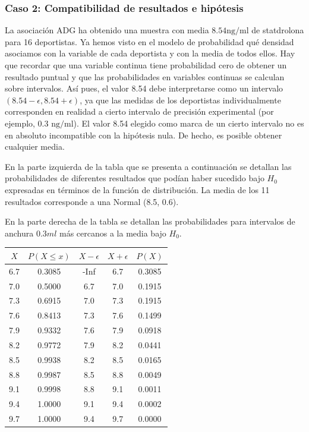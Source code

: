 \documentclass[
]{article}
\begin{document}
\subsubsection{Caso 2: Compatibilidad de resultados e hipótesis}\label{caso-2-compatibilidad-de-resultados-e-hipuxf3tesis}

La asociación ADG ha obtenido una muestra con media \(8.54 \mathrm{ng} / \mathrm{ml}\) de statdrolona para 16 deportistas. Ya hemos visto en el modelo de probabilidad qué densidad asociamos con la variable de cada deportista y con la media de todos ellos. Hay que recordar que una variable continua tiene probabilidad cero de obtener un resultado puntual y que las probabilidades en variables continuas se calculan sobre intervalos. Así pues, el valor 8.54 debe interpretarse como un intervalo \((8.54-\epsilon, 8.54+\epsilon)\), ya que las medidas de los deportistas individualmente corresponden en realidad a cierto intervalo de precisión experimental (por ejemplo, 0.3 \(\mathrm{ng} / \mathrm{ml}\)). El valor 8.54 elegido como marca de un cierto intervalo no es en absoluto incompatible con la hipótesis nula. De hecho, es posible obtener cualquier media.

En la parte izquierda de la tabla que se presenta a continuación se detallan las probabilidades de diferentes resultados que podían haber sucedido bajo \(H_0\) expresadas en términos de la función de distribución. La media de los 11 resultados corresponde a una Normal (8.5, 0.6).

En la parte derecha de la tabla se detallan las probabilidades para intervalos de anchura \(0.3 ml\) más cercanos a la media bajo \(H_0\).

\begin{tabular}{c|c|c|c|c}
\hline
$X$ & $P(X\leq x)$ & $X-\epsilon$ & $X+\epsilon$ & $P(X)$\\
\hline
6.7 & 0.3085 & -Inf & 6.7 & 0.3085\\
\hline
7.0 & 0.5000 & 6.7 & 7.0 & 0.1915\\
\hline
7.3 & 0.6915 & 7.0 & 7.3 & 0.1915\\
\hline
7.6 & 0.8413 & 7.3 & 7.6 & 0.1499\\
\hline
7.9 & 0.9332 & 7.6 & 7.9 & 0.0918\\
\hline
8.2 & 0.9772 & 7.9 & 8.2 & 0.0441\\
\hline
8.5 & 0.9938 & 8.2 & 8.5 & 0.0165\\
\hline
8.8 & 0.9987 & 8.5 & 8.8 & 0.0049\\
\hline
9.1 & 0.9998 & 8.8 & 9.1 & 0.0011\\
\hline
9.4 & 1.0000 & 9.1 & 9.4 & 0.0002\\
\hline
9.7 & 1.0000 & 9.4 & 9.7 & 0.0000\\
\hline
\end{tabular}
\end{document}
